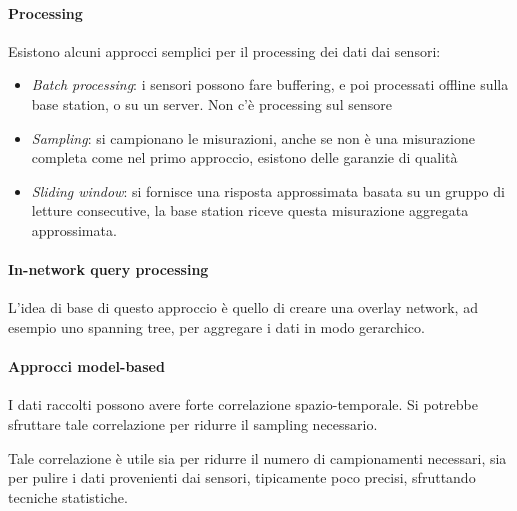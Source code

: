 \paragraph{Processing}
Esistono alcuni approcci semplici per il processing dei dati dai sensori:
\begin{itemize}
    \item \emph{Batch processing}: i sensori possono fare buffering, e poi processati offline sulla base station, 
    o su un server.
    Non c'è processing sul sensore
    \item \emph{Sampling}: si campionano le misurazioni, anche se non 
    è una misurazione completa come nel primo approccio, esistono delle garanzie 
    di qualità
    \item \emph{Sliding window}: si fornisce una risposta approssimata 
    basata su un gruppo di letture consecutive, la base station 
    riceve questa misurazione aggregata approssimata.
\end{itemize}

\paragraph{In-network query processing}
L'idea di base di questo approccio è quello 
di creare una overlay network, ad esempio uno spanning tree, 
per aggregare i dati in modo gerarchico.

\paragraph{Approcci model-based}
I dati raccolti possono avere forte correlazione spazio-temporale.
Si potrebbe sfruttare tale correlazione per ridurre il sampling necessario.

Tale correlazione è utile sia per ridurre il numero di campionamenti 
necessari, sia per pulire i dati provenienti dai sensori, tipicamente 
poco precisi, sfruttando tecniche statistiche.